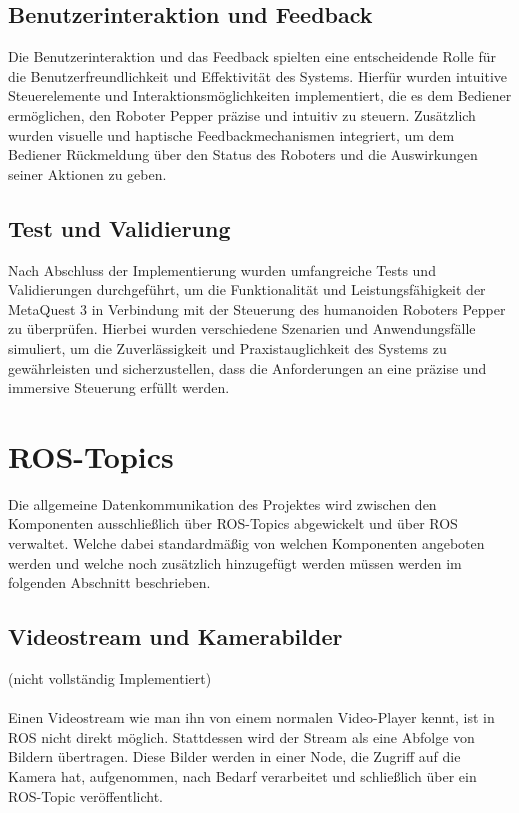 \subsection{Benutzerinteraktion und Feedback}
Die Benutzerinteraktion und das Feedback spielten eine entscheidende Rolle für die Benutzerfreundlichkeit und Effektivität des Systems. Hierfür wurden intuitive Steuerelemente und Interaktionsmöglichkeiten implementiert, die es dem Bediener ermöglichen, den Roboter Pepper präzise und intuitiv zu steuern. Zusätzlich wurden visuelle und haptische Feedbackmechanismen integriert, um dem Bediener Rückmeldung über den Status des Roboters und die Auswirkungen seiner Aktionen zu geben.

\subsection{Test und Validierung}
Nach Abschluss der Implementierung wurden umfangreiche Tests und Validierungen durchgeführt, um die Funktionalität und Leistungsfähigkeit der MetaQuest 3 in Verbindung mit der Steuerung des humanoiden Roboters Pepper zu überprüfen. Hierbei wurden verschiedene Szenarien und Anwendungsfälle simuliert, um die Zuverlässigkeit und Praxistauglichkeit des Systems zu gewährleisten und sicherzustellen, dass die Anforderungen an eine präzise und immersive Steuerung erfüllt werden.

\section{ROS-Topics}\label{sec:ros-topics}
Die allgemeine Datenkommunikation des Projektes wird zwischen den Komponenten ausschließlich über \ac{ROS}-Topics abgewickelt und über \ac{ROS} verwaltet. Welche dabei standardmäßig von welchen Komponenten angeboten werden und welche noch zusätzlich hinzugefügt werden müssen werden im folgenden Abschnitt beschrieben.\\
\subsection{Videostream und Kamerabilder}\label{subsec:Videostream}
(nicht vollständig Implementiert)\\\\
Einen Videostream wie man ihn von einem normalen Video-Player kennt, ist in \ac{ROS} nicht direkt möglich. Stattdessen wird der Stream als eine Abfolge von Bildern übertragen. Diese Bilder werden in einer Node, die Zugriff auf die Kamera hat, aufgenommen, nach Bedarf verarbeitet und schließlich über ein \ac{ROS}-Topic veröffentlicht.
\\

